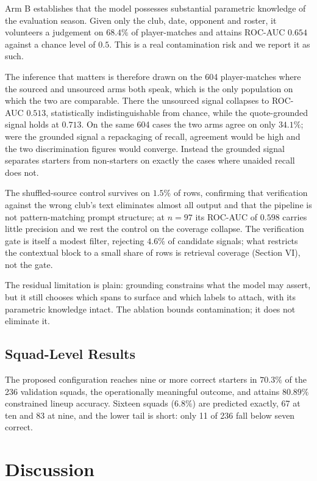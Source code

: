 \documentclass[conference]{IEEEtran}
\begin{document}
Arm B establishes that the model possesses substantial parametric knowledge of the evaluation season. Given only the club, date, opponent and roster, it volunteers a judgement on $68.4\%$ of player-matches and attains ROC-AUC $0.654$ against a chance level of $0.5$. This is a real contamination risk and we report it as such.

The inference that matters is therefore drawn on the 604 player-matches where the sourced and unsourced arms both speak, which is the only population on which the two are comparable. There the unsourced signal collapses to ROC-AUC $0.513$, statistically indistinguishable from chance, while the quote-grounded signal holds at $0.713$. On the same 604 cases the two arms agree on only $34.1\%$; were the grounded signal a repackaging of recall, agreement would be high and the two discrimination figures would converge. Instead the grounded signal separates starters from non-starters on exactly the cases where unaided recall does not.

The shuffled-source control survives on $1.5\%$ of rows, confirming that verification against the wrong club's text eliminates almost all output and that the pipeline is not pattern-matching prompt structure; at $n = 97$ its ROC-AUC of $0.598$ carries little precision and we rest the control on the coverage collapse. The verification gate is itself a modest filter, rejecting $4.6\%$ of candidate signals; what restricts the contextual block to a small share of rows is retrieval coverage (Section VI), not the gate.

The residual limitation is plain: grounding constrains what the model may assert, but it still chooses which spans to surface and which labels to attach, with its parametric knowledge intact. The ablation bounds contamination; it does not eliminate it.

\subsection{Squad-Level Results}

The proposed configuration reaches nine or more correct starters in $70.3\%$ of the 236 validation squads, the operationally meaningful outcome, and attains $80.89\%$ constrained lineup accuracy. Sixteen squads ($6.8\%$) are predicted exactly, 67 at ten and 83 at nine, and the lower tail is short: only 11 of 236 fall below seven correct.

\section{Discussion}
\end{document}
